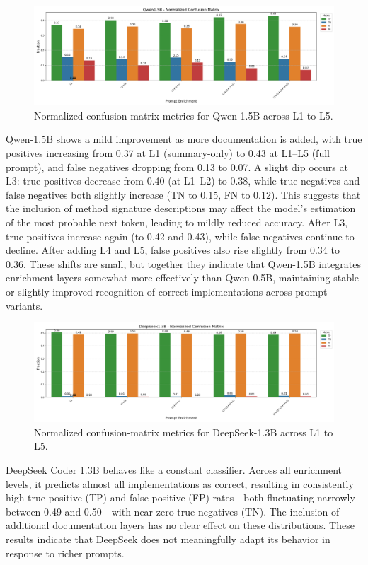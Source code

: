 \documentclass[a4paper]{usiinfbachelorproject}
\begin{document}
\begin{figure}[H]\centering
  \includegraphics[width=\linewidth]{figures/Qwen1.5B_matrix.png}
  \caption{Normalized confusion-matrix metrics for Qwen-1.5B across L1 to L5.}
  \label{fig:qwen15-matrix}
\end{figure}
\noindent
Qwen-1.5B shows a mild improvement as more documentation is added, with true positives increasing from 0.37 at L1 (summary-only) to 0.43 at L1–L5 (full prompt), and false negatives dropping from 0.13 to 0.07. A slight dip occurs at L3: true positives decrease from 0.40 (at L1–L2) to 0.38, while true negatives and false negatives both slightly increase (TN to 0.15, FN to 0.12). This suggests that the inclusion of method signature descriptions may affect the model’s estimation of the most probable next token, leading to mildly reduced accuracy. After L3, true positives increase again (to 0.42 and 0.43), while false negatives continue to decline. After adding L4 and L5, false positives also rise slightly from 0.34 to 0.36. These shifts are small, but together they indicate that Qwen-1.5B integrates enrichment layers somewhat more effectively than Qwen-0.5B, maintaining stable or slightly improved recognition of correct implementations across prompt variants.
\begin{figure}[H]\centering
  \includegraphics[width=\linewidth]{figures/DeepSeek1.3B_matrix.png}
  \caption{Normalized confusion-matrix metrics for DeepSeek-1.3B across L1 to L5.}
  \label{fig:deepseek-matrix}
\end{figure}
\noindent
DeepSeek Coder 1.3B behaves like a constant classifier. Across all enrichment levels, it predicts almost all implementations as correct, resulting in consistently high true positive (TP) and false positive (FP) rates—both fluctuating narrowly between 0.49 and 0.50—with near-zero true negatives (TN). The inclusion of additional documentation layers has no clear effect on these distributions. These results indicate that DeepSeek does not meaningfully adapt its behavior in response to richer prompts.
\end{document}
